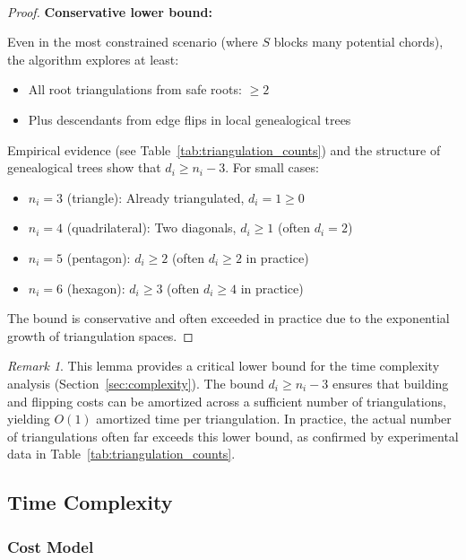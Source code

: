 ﻿﻿\documentclass[12pt,a4paper]{article}
\theoremstyle{definition}
\theoremstyle{remark}
\newtheorem{remark}{Remark}
\begin{document}
\begin{proof}
	\medskip
	\noindent\textbf{Conservative lower bound:}

	Even in the most constrained scenario (where $S$ blocks many potential chords), the algorithm explores at least:
	\begin{itemize}
		\item All root triangulations from safe roots: $\geq 2$
		\item Plus descendants from edge flips in local genealogical trees
	\end{itemize}

	Empirical evidence (see Table~\ref{tab:triangulation_counts}) and the structure of genealogical trees show that $d_i \geq n_i - 3$. For small cases:
	\begin{itemize}
		\item $n_i = 3$ (triangle): Already triangulated, $d_i = 1 \geq 0$ \checkmark
		\item $n_i = 4$ (quadrilateral): Two diagonals, $d_i \geq 1$ (often $d_i = 2$)
		\item $n_i = 5$ (pentagon): $d_i \geq 2$ (often $d_i \geq 2$ in practice)
		\item $n_i = 6$ (hexagon): $d_i \geq 3$ (often $d_i \geq 4$ in practice)
	\end{itemize}

	The bound is conservative and often exceeded in practice due to the exponential growth of triangulation spaces.
\end{proof}

\begin{remark}
	This lemma provides a critical lower bound for the time complexity analysis (Section~\ref{sec:complexity}). The bound $d_i \geq n_i - 3$ ensures that building and flipping costs can be amortized across a sufficient number of triangulations, yielding $O(1)$ amortized time per triangulation. In practice, the actual number of triangulations often far exceeds this lower bound, as confirmed by experimental data in Table~\ref{tab:triangulation_counts}.
\end{remark}


\subsection{Time Complexity}

\subsubsection{Cost Model}
\end{document}
